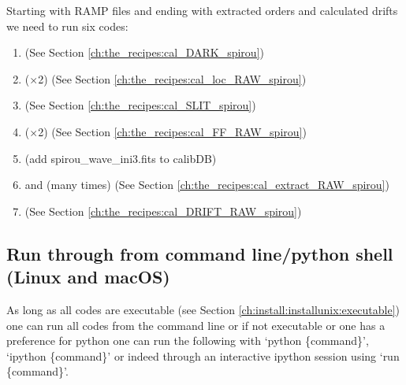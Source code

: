 \noindent Starting with RAMP files and ending with extracted orders and calculated drifts we need to run six codes:
\begin{enumerate}
\item \calDARK \hfill (See Section \ref{ch:the_recipes:cal_DARK_spirou})
\item \callocRAW ($\times$2) \hfill (See Section \ref{ch:the_recipes:cal_loc_RAW_spirou})
\item \calSLIT \hfill (See Section \ref{ch:the_recipes:cal_SLIT_spirou})
\item \calFFraw ($\times$2) \hfill (See Section \ref{ch:the_recipes:cal_FF_RAW_spirou})
\item (add spirou\_wave\_ini3.fits to calibDB) 
\item \calextractRAWAB and \calextractRAWC (many times) \hfill (See Section \ref{ch:the_recipes:cal_extract_RAW_spirou})
\item \calDRIFTRAW \hfill (See Section \ref{ch:the_recipes:cal_DRIFT_RAW_spirou})
\end{enumerate}





\subsection{Run through from command line/python shell (Linux and macOS)}
\label{chapter:using_the_drs:working_example:run_cmd}

As long as all codes are executable (see Section \ref{ch:install:installunix:executable}) one can run all codes from the command line or if not executable or one has a preference for python one can run the following with `python \{command\}', `ipython \{command\}' or indeed through an interactive ipython session using `run \{command\}'.

